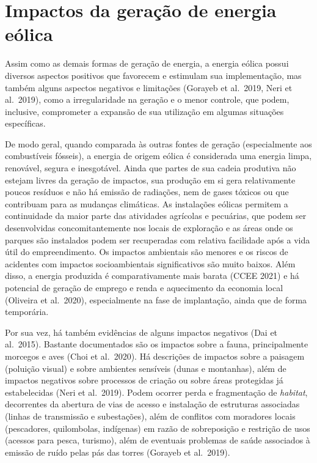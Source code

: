 \documentclass[
  oneside]{scrbook}
\begin{document}
\hypertarget{impactos-da-gerauxe7uxe3o-de-energia-euxf3lica}{%
\section{Impactos da geração de energia eólica}\label{impactos-da-gerauxe7uxe3o-de-energia-euxf3lica}}

Assim como as demais formas de geração de energia, a energia eólica possui diversos aspectos positivos que favorecem e estimulam sua implementação, mas também alguns aspectos negativos e limitações (Gorayeb et al.~2019, Neri et al.~2019), como a irregularidade na geração e o menor controle, que podem, inclusive, comprometer a expansão de sua utilização em algumas situações específicas.

De modo geral, quando comparada às outras fontes de geração (especialmente aos combustíveis fósseis), a energia de origem eólica é considerada uma energia limpa, renovável, segura e inesgotável. Ainda que partes de sua cadeia produtiva não estejam livres da geração de impactos, sua produção em si gera relativamente poucos resíduos e não há emissão de radiações, nem de gases tóxicos ou que contribuam para as mudanças climáticas. As instalações eólicas permitem a continuidade da maior parte das atividades agrícolas e pecuárias, que podem ser desenvolvidas concomitantemente nos locais de exploração e as áreas onde os parques são instalados podem ser recuperadas com relativa facilidade após a vida útil do empreendimento. Os impactos ambientais são menores e os riscos de acidentes com impactos socioambientais significativos são muito baixos. Além disso, a energia produzida é comparativamente mais barata (CCEE 2021) e há potencial de geração de emprego e renda e aquecimento da economia local (Oliveira et al.~2020), especialmente na fase de implantação, ainda que de forma temporária.

Por sua vez, há também evidências de alguns impactos negativos (Dai et al.~2015). Bastante documentados são os impactos sobre a fauna, principalmente morcegos e aves (Choi et al.~2020). Há descrições de impactos sobre a paisagem (poluição visual) e sobre ambientes sensíveis (dunas e montanhas), além de impactos negativos sobre processos de criação ou sobre áreas protegidas já estabelecidas (Neri et al.~2019). Podem ocorrer perda e fragmentação de \emph{habitat}, decorrentes da abertura de vias de acesso e instalação de estruturas associadas (linhas de transmissão e subestações), além de conflitos com moradores locais (pescadores, quilombolas, indígenas) em razão de sobreposição e restrição de usos (acessos para pesca, turismo), além de eventuais problemas de saúde associados à emissão de ruído pelas pás das torres (Gorayeb et al.~2019).
\end{document}
